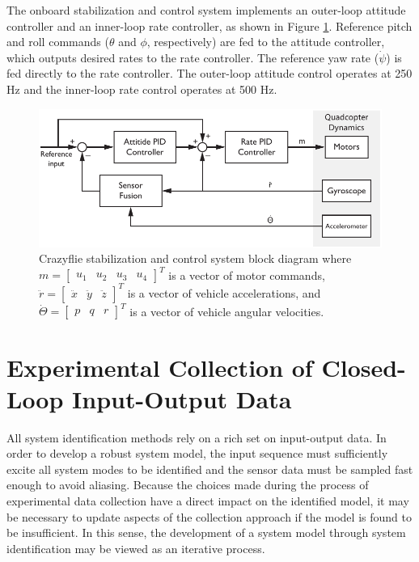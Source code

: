 The onboard stabilization and control system implements an outer-loop attitude controller and an inner-loop rate controller, as shown in Figure \ref{fig:control_system_block_diagram}. Reference pitch and roll commands ($\theta$ and $\phi$, respectively) are fed to the attitude controller, which outputs desired rates to the rate controller. The reference yaw rate ($\dot\psi$) is fed directly to the rate controller. The outer-loop attitude control operates at 250 Hz and the inner-loop rate control operates at 500 Hz.
\begin{figure}[htb!]
	\centering
	\includegraphics{../fig/crazyflie_control_system_block_diagram.pdf}
	\caption[Crazyflie stabilization and control system block diagram.]{Crazyflie stabilization and control system block diagram where $m = \begin{bmatrix}u_1 & u_2 & u_3 & u_4\end{bmatrix}^T$ is a vector of motor commands, $\ddot r = \begin{bmatrix}\ddot{x}&\ddot{y}&\ddot{z}\end{bmatrix}^T$ is a vector of vehicle accelerations, and $\dot\Theta = \begin{bmatrix}p & q & r\end{bmatrix}^T$ is a vector of vehicle angular velocities.}
	\label{fig:control_system_block_diagram}
\end{figure}


\section{Experimental Collection of Closed-Loop Input-Output Data}
All system identification methods rely on a rich set on input-output data. In order to develop a robust system model, the input sequence must sufficiently excite all system modes to be identified and the sensor data must be sampled fast enough to avoid aliasing. Because the choices made during the process of experimental data collection have a direct impact on the identified model, it may be necessary to update aspects of the collection approach if the model is found to be insufficient. In this sense, the development of a system model through system identification may be viewed as an iterative process.

